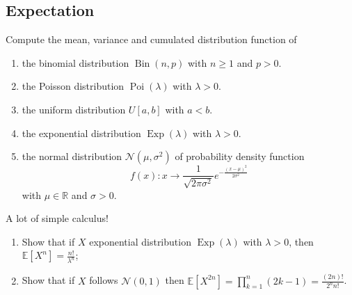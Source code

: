 \begin{center}
  \section*{Expectation}
\end{center}

\begin{Exercise}
  Compute the mean, variance and cumulated distribution function of
  \vspace*{0.2cm}

  \begin{enumerate}
    \item the binomial distribution $\operatorname{Bin}(n, p)$ with $n \geq 1$ and $p>0$.

    \item the Poisson distribution $\operatorname{Poi}(\lambda)$ with $\lambda>0$.

    \item the uniform distribution $U[a, b]$ with $a<b$.

    \item the exponential distribution $\operatorname{Exp}(\lambda)$ with $\lambda>0$.

    \item the normal distribution $\mathcal{N}\left(\mu, \sigma^{2}\right)$ of probability density function
          \[
            f(x) : x \to \frac{1}{\sqrt{2\pi \sigma^2}} e^{- \frac{{(x-\mu)}^2}{2 \sigma^2}}
          \]
          with $\mu \in \mathbb{R}$ and $\sigma>0$.

  \end{enumerate}
\end{Exercise}

\begin{solution}
  A lot of simple calculus!
\end{solution}

\begin{Exercise}
  \begin{enumerate}
    \item Show that if $X$ exponential distribution $\operatorname{Exp}(\lambda)$ with $\lambda>0$, then $\mathbb{E}\left[X^{n}\right]=\frac{n !}{\lambda^{n}}$;

    \item Show that if $X$ follows $\mathcal{N}(0,1)$ then $\mathbb{E}\left[X^{2 n}\right]=\prod_{k=1}^{n}(2 k-1)=\frac{(2 n) !}{2^{n} n !}$.

  \end{enumerate}
\end{Exercise}

